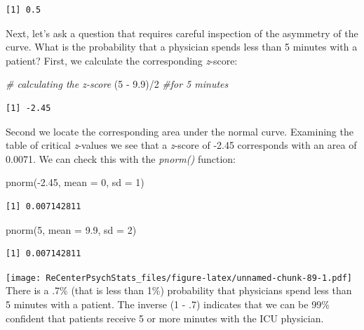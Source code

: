 \documentclass[
  11pt,
]{book}
\newenvironment{Shaded}{\begin{snugshade}}{\end{snugshade}}
\newcommand{\AttributeTok}[1]{\textcolor[rgb]{0.77,0.63,0.00}{#1}}
\newcommand{\CommentTok}[1]{\textcolor[rgb]{0.56,0.35,0.01}{\textit{#1}}}
\newcommand{\DecValTok}[1]{\textcolor[rgb]{0.00,0.00,0.81}{#1}}
\newcommand{\FloatTok}[1]{\textcolor[rgb]{0.00,0.00,0.81}{#1}}
\newcommand{\FunctionTok}[1]{\textcolor[rgb]{0.00,0.00,0.00}{#1}}
\newcommand{\NormalTok}[1]{#1}
\newcommand{\SpecialCharTok}[1]{\textcolor[rgb]{0.00,0.00,0.00}{#1}}
\begin{document}
\begin{verbatim}
[1] 0.5
\end{verbatim}

Next, let's ask a question that requires careful inspection of the asymmetry of the curve. What is the probability that a physician spends less than 5 minutes with a patient? First, we calculate the corresponding \emph{z}-score:

\begin{Shaded}
\begin{Highlighting}[]
\CommentTok{\# calculating the z{-}score}
\NormalTok{(}\DecValTok{5} \SpecialCharTok{{-}} \FloatTok{9.9}\NormalTok{)}\SpecialCharTok{/}\DecValTok{2}  \CommentTok{\#for 5 minutes}
\end{Highlighting}
\end{Shaded}

\begin{verbatim}
[1] -2.45
\end{verbatim}

Second we locate the corresponding area under the normal curve. Examining the table of critical \emph{z}-values we see that a \emph{z}-score of -2.45 corresponds with an area of 0.0071. We can check this with the \emph{pnorm()} function:

\begin{Shaded}
\begin{Highlighting}[]
\FunctionTok{pnorm}\NormalTok{(}\SpecialCharTok{{-}}\FloatTok{2.45}\NormalTok{, }\AttributeTok{mean =} \DecValTok{0}\NormalTok{, }\AttributeTok{sd =} \DecValTok{1}\NormalTok{)}
\end{Highlighting}
\end{Shaded}

\begin{verbatim}
[1] 0.007142811
\end{verbatim}

\begin{Shaded}
\begin{Highlighting}[]
\FunctionTok{pnorm}\NormalTok{(}\DecValTok{5}\NormalTok{, }\AttributeTok{mean =} \FloatTok{9.9}\NormalTok{, }\AttributeTok{sd =} \DecValTok{2}\NormalTok{)}
\end{Highlighting}
\end{Shaded}

\begin{verbatim}
[1] 0.007142811
\end{verbatim}

\texttt{[image: ReCenterPsychStats\_files/figure-latex/unnamed-chunk-89-1.pdf]}
There is a .7\% (that is less than 1\%) probability that physicians spend less than 5 minutes with a patient. The inverse (1 - .7) indicates that we can be 99\% confident that patients receive 5 or more minutes with the ICU physician.
\end{document}
